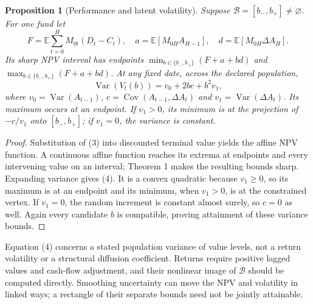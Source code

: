 \documentclass[11pt]{article}
\newtheorem{proposition}[theorem]{Proposition}
\theoremstyle{remark}
\newcommand{\E}{\mathbb E}
\newcommand{\Var}{\operatorname{Var}}
\newcommand{\Cov}{\operatorname{Cov}}
\begin{document}
\begin{proposition}[Performance and latent volatility]
Suppose $\mathcal B=[b_-,b_+]\ne\varnothing$. For one fund let
\[
 F=\E\sum_{t=0}^{H}M_{0t}(D_t-C_t),\quad
 a=\E[M_{0H}A_{H-1}],\quad d=\E[M_{0H}\Delta A_H].
\]
Its sharp NPV interval has endpoints
$\min_{b\in\{b_-,b_+\}}(F+a+bd)$ and
$\max_{b\in\{b_-,b_+\}}(F+a+bd)$.
At any fixed date, across the declared population,
\[
 \Var(V_t(b))=v_0+2bc+b^2v_1,                                    \tag{4}
\]
where $v_0=\Var(A_{t-1})$, $c=\Cov(A_{t-1},\Delta A_t)$ and
$v_1=\Var(\Delta A_t)$. Its maximum occurs at an endpoint. If $v_1>0$,
its minimum is at the projection of $-c/v_1$ onto $[b_-,b_+]$; if
$v_1=0$, the variance is constant.
\end{proposition}
\begin{proof}
Substitution of (3) into discounted terminal value yields the affine NPV
function. A continuous affine function reaches its extrema at endpoints
and every intervening value on an interval; Theorem 1 makes the resulting
bounds sharp. Expanding variance gives (4). It is a convex quadratic
because $v_1\geq0$, so its maximum is at an endpoint and its minimum,
when $v_1>0$, is at the constrained vertex. If $v_1=0$, the random
increment is constant almost surely, so $c=0$ as well. Again every
candidate $b$ is compatible, proving attainment of these variance bounds.
\end{proof}
Equation (4) concerns a stated population variance of value levels, not
a return volatility or a structural diffusion coefficient. Returns require
positive lagged values and cash-flow adjustment, and their nonlinear image
of $\mathcal B$ should be computed directly. Smoothing uncertainty can
move the NPV and volatility in linked ways; a rectangle of their separate
bounds need not be jointly attainable.
\end{document}
